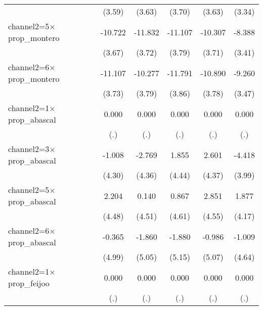 \begin{table}[htbp]
\begin{tabular}{l*{5}{c}}
                    &      (3.59)         &      (3.63)         &      (3.70)         &      (3.63)         &      (3.34)         \\
channel2=5$\times$prop\_montero&     -10.722\sym{**} &     -11.832\sym{**} &     -11.107\sym{**} &     -10.307\sym{**} &      -8.388\sym{*}  \\
                    &      (3.67)         &      (3.72)         &      (3.79)         &      (3.71)         &      (3.41)         \\
channel2=6$\times$prop\_montero&     -11.107\sym{**} &     -10.277\sym{**} &     -11.791\sym{**} &     -10.890\sym{**} &      -9.260\sym{**} \\
                    &      (3.73)         &      (3.79)         &      (3.86)         &      (3.78)         &      (3.47)         \\
channel2=1$\times$prop\_abascal&       0.000         &       0.000         &       0.000         &       0.000         &       0.000         \\
                    &         (.)         &         (.)         &         (.)         &         (.)         &         (.)         \\
channel2=3$\times$prop\_abascal&      -1.008         &      -2.769         &       1.855         &       2.601         &      -4.418         \\
                    &      (4.30)         &      (4.36)         &      (4.44)         &      (4.37)         &      (3.99)         \\
channel2=5$\times$prop\_abascal&       2.204         &       0.140         &       0.867         &       2.851         &       1.877         \\
                    &      (4.48)         &      (4.51)         &      (4.61)         &      (4.55)         &      (4.17)         \\
channel2=6$\times$prop\_abascal&      -0.365         &      -1.860         &      -1.880         &      -0.986         &      -1.009         \\
                    &      (4.99)         &      (5.05)         &      (5.15)         &      (5.07)         &      (4.64)         \\
channel2=1$\times$prop\_feijoo&       0.000         &       0.000         &       0.000         &       0.000         &       0.000         \\
                    &         (.)         &         (.)         &         (.)         &         (.)         &         (.)         \\

\end{tabular}
\end{table}
